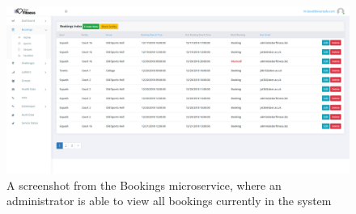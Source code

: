 \begin{figure}[H]
    \centering
    \includegraphics[width=\textwidth]{Images/service_bookings.png}
    \caption{A screenshot from the Bookings microservice, where an administrator is able to view all bookings currently in the system}
\end{figure}